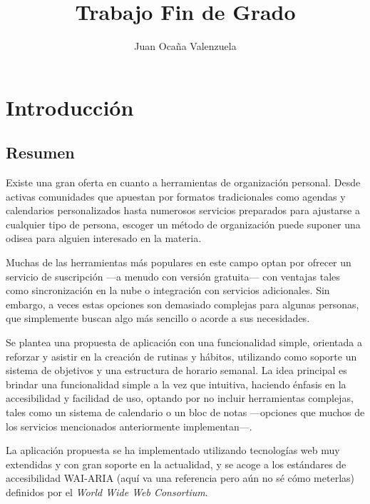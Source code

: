 \documentclass[10pt, a4paper]{aqademic}
\author{Juan Ocaña Valenzuela}
\title{Trabajo Fin de Grado}
\begin{document}
\AqMaketitle[%
	cover    = img/logo.png,
	org      = Grado en Ingeniería Informática,
	subtitle = Aplicación de gestión de rutinas semanales basada en tecnologías web
	url      = https://github.com/patchispatch/
]
\tableofcontents

\chapter{Introducción}

\section{Resumen}

Existe una gran oferta en cuanto a herramientas de organización personal. Desde activas comunidades que apuestan por formatos tradicionales como agendas y calendarios personalizados hasta numerosos servicios preparados para ajustarse a cualquier tipo de persona, escoger un método de organización puede suponer una odisea para alguien interesado en la materia. 

\medskip

Muchas de las herramientas más populares en este campo optan por ofrecer un servicio de suscripción ---a menudo con versión gratuita--- con ventajas tales como sincronización en la nube o integración con servicios adicionales. Sin embargo, a veces estas opciones son demasiado complejas para algunas personas, que simplemente buscan algo más sencillo o acorde a sus necesidades.

\medskip

Se plantea una propuesta de aplicación con una funcionalidad simple, orientada a reforzar y asistir en la creación de rutinas y hábitos, utilizando como soporte un sistema de objetivos y una estructura de horario semanal. La idea principal es brindar una funcionalidad simple a la vez que intuitiva, haciendo énfasis en la accesibilidad y facilidad de uso, optando por no incluir herramientas complejas, tales como un sistema de calendario o un bloc de notas ---opciones que muchos de los servicios mencionados anteriormente implementan---.

\medskip

La aplicación propuesta se ha implementado utilizando tecnologías web muy extendidas y con gran soporte en la actualidad, y se acoge a los estándares de accesibilidad WAI-ARIA (aquí va una referencia pero aún no sé cómo meterlas) definidos por el \textit{World Wide Web Consortium}. 
\end{document}
